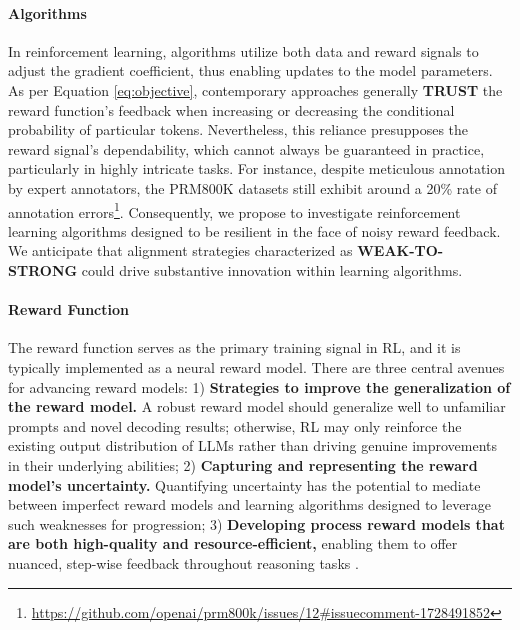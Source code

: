 \begin{itemize}[topsep=0pt]
\begin{itemize}[topsep=0pt]
\paragraph{Algorithms} In reinforcement learning, algorithms utilize both data and reward signals to adjust the gradient coefficient, thus enabling updates to the model parameters. As per Equation \ref{eq:objective}, contemporary approaches generally \textbf{TRUST} the reward function's feedback when increasing or decreasing the conditional probability of particular tokens. Nevertheless, this reliance presupposes the reward signal’s dependability, which cannot always be guaranteed in practice, particularly in highly intricate tasks. For instance, despite meticulous annotation by expert annotators, the PRM800K datasets \citep{lightman2023let} still exhibit around a 20\% rate of annotation errors\footnote{\url{https://github.com/openai/prm800k/issues/12\#issuecomment-1728491852}}. Consequently, we propose to investigate reinforcement learning algorithms designed to be resilient in the face of noisy reward feedback. We anticipate that alignment strategies characterized as \textbf{WEAK-TO-STRONG} \citep{burns2023weak} could drive substantive innovation within learning algorithms.

\paragraph{Reward Function} The reward function serves as the primary training signal in RL, and it is typically implemented as a neural reward model. There are three central avenues for advancing reward models: 1) \textbf{Strategies to improve the generalization of the reward model.} A robust reward model should generalize well to unfamiliar prompts and novel decoding results; otherwise, RL may only reinforce the existing output distribution of LLMs rather than driving genuine improvements in their underlying abilities; 2) \textbf{Capturing and representing the reward model’s uncertainty.} Quantifying uncertainty has the potential to mediate between imperfect reward models and learning algorithms designed to leverage such weaknesses for progression; 3) \textbf{Developing process reward models that are both high-quality and resource-efficient,} enabling them to offer nuanced, step-wise feedback throughout reasoning tasks \citep{lightman2023let,wang2023math}.


\end{itemize}
\end{itemize}
